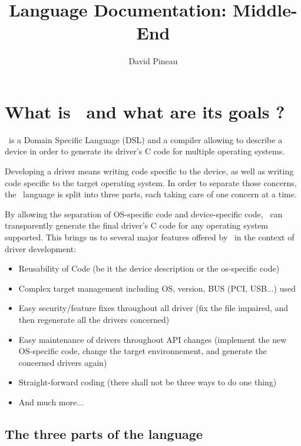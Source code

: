 \documentclass[american]{rtxreport}
\author{David Pineau}
\title{Language Documentation: Middle-End}
\begin{document}
\maketitle

\rtxmaketitleblock

\tableofcontents


\chapter{What is \rtx\ and what are its goals ?}

\rtx\ is a Domain Specific Language (DSL) and a compiler allowing to
describe a device in order to generate its driver's C code for multiple
operating systems.

Developing a driver means writing code specific to the device, as well as
writing code specific to the target operating system. In order to separate
those concerns, the \rtx\ language is split into three parts, each taking care
of one concern at a time.

By allowing the separation of OS-specific code and device-specific code, \rtx\
can transparently generate the final driver's C code for any operating system
supported. This brings us to several major features offered by \rtx\ in the
context of driver development:
\begin{itemize}
    \item Reusability of Code (be it the device description or
            the os-specific code)
    \item Complex target management including OS, version,
            BUS (PCI, USB...) used
    \item Easy security/feature fixes throughout all driver (fix the file
            impaired, and then regenerate all the drivers concerned)
    \item Easy maintenance of drivers throughout API changes (implement the
            new OS-specific code, change the target environnement,
            and generate the concerned drivers again)
    \item Straight-forward coding (there shall not be three ways
                                   to do one thing)
    \item And much more...
\end{itemize}

\section{The three parts of the language}
\end{document}
